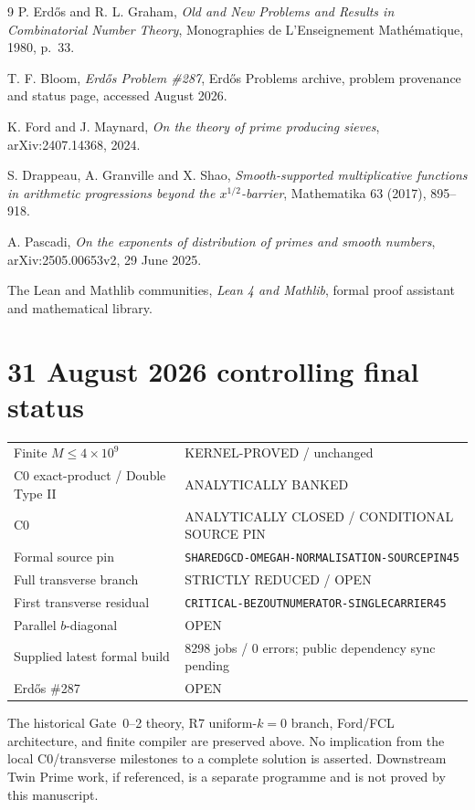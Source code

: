 \documentclass[11pt]{article}
\theoremstyle{definition}
\newcommand{\1}{\mathbf 1}
\newcommand{\status}[1]{\textsf{#1}}
\begin{document}
\begin{thebibliography}{9}
P. Erd\H{o}s and R. L. Graham,
\emph{Old and New Problems and Results in Combinatorial Number Theory},
Monographies de L'Enseignement Math\'ematique, 1980, p.~33.

T. F. Bloom,
\emph{Erd\H{o}s Problem \#287}, Erd\H{o}s Problems archive,
problem provenance and status page, accessed August 2026.

K. Ford and J. Maynard,
\emph{On the theory of prime producing sieves},
arXiv:2407.14368, 2024.

S. Drappeau, A. Granville and X. Shao,
\emph{Smooth-supported multiplicative functions in arithmetic progressions beyond the
$x^{1/2}$-barrier}, Mathematika 63 (2017), 895--918.

A. Pascadi,
\emph{On the exponents of distribution of primes and smooth numbers},
arXiv:2505.00653v2, 29 June 2025.

The Lean and Mathlib communities,
\emph{Lean 4 and Mathlib}, formal proof assistant and mathematical library.
\end{thebibliography}

\section*{31 August 2026 controlling final status}
\begin{center}
\small
\begin{tabular}{ll}
\toprule
Finite $M\le4\times10^9$ & \status{KERNEL-PROVED / unchanged}\\
C0 exact-product / Double Type II & \status{ANALYTICALLY BANKED}\\
C0 & \status{ANALYTICALLY CLOSED / CONDITIONAL SOURCE PIN}\\
Formal source pin & \texttt{SHAREDGCD-OMEGAH-NORMALISATION-SOURCEPIN45}\\
Full transverse branch & \status{STRICTLY REDUCED / OPEN}\\
First transverse residual & \texttt{CRITICAL-BEZOUTNUMERATOR-SINGLECARRIER45}\\
Parallel $b$-diagonal & \status{OPEN}\\
Supplied latest formal build & \status{8298 jobs / 0 errors; public dependency sync pending}\\
Erd\H{o}s \#287 & \status{OPEN}\\
\bottomrule
\end{tabular}
\end{center}

The historical Gate~0--2 theory, R7 uniform-$k=0$ branch, Ford/FCL architecture, and finite
compiler are preserved above. No implication from the local C0/transverse milestones to a
complete solution is asserted. Downstream Twin Prime work, if referenced, is a separate
programme and is not proved by this manuscript.
\end{document}
